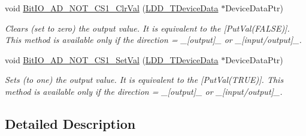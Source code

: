 \begin{DoxyCompactItemize}
void \hyperlink{group___bit_i_o___a_d___n_o_t___c_s1__module_gadad3d876c08eca49edfa6e2cfb6fc48b}{Bit\-I\-O\-\_\-\-A\-D\-\_\-\-N\-O\-T\-\_\-\-C\-S1\-\_\-\-Clr\-Val} (\hyperlink{group___p_e___types__module_gac5cf1362f1f0e3a2ce71b1bf2276d091}{L\-D\-D\-\_\-\-T\-Device\-Data} $\ast$Device\-Data\-Ptr)
\begin{DoxyCompactList}\small\item\em Clears (set to zero) the output value. It is equivalent to the \mbox{[}Put\-Val(\-F\-A\-L\-S\-E)\mbox{]}. This method is available only if the direction = \-\_\-\mbox{[}output\mbox{]}\-\_\- or \-\_\-\mbox{[}input/output\mbox{]}\-\_\-. \end{DoxyCompactList}\item 
void \hyperlink{group___bit_i_o___a_d___n_o_t___c_s1__module_ga414991c8e2303a9daf8aac6ed7618b22}{Bit\-I\-O\-\_\-\-A\-D\-\_\-\-N\-O\-T\-\_\-\-C\-S1\-\_\-\-Set\-Val} (\hyperlink{group___p_e___types__module_gac5cf1362f1f0e3a2ce71b1bf2276d091}{L\-D\-D\-\_\-\-T\-Device\-Data} $\ast$Device\-Data\-Ptr)
\begin{DoxyCompactList}\small\item\em Sets (to one) the output value. It is equivalent to the \mbox{[}Put\-Val(\-T\-R\-U\-E)\mbox{]}. This method is available only if the direction = \-\_\-\mbox{[}output\mbox{]}\-\_\- or \-\_\-\mbox{[}input/output\mbox{]}\-\_\-. \end{DoxyCompactList}\end{DoxyCompactItemize}


\subsection{Detailed Description}


